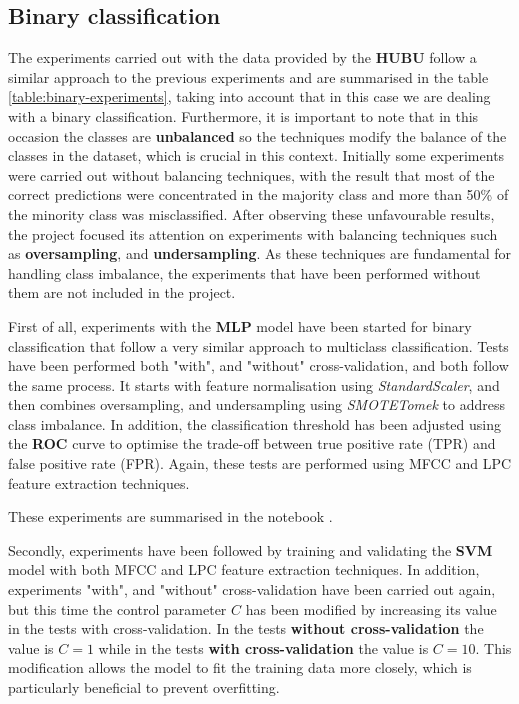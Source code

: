 \newpage

\subsection{Binary classification}

The experiments carried out with the data provided by the \textbf{HUBU} follow a similar approach to the previous experiments and are summarised in the table \ref{table:binary-experiments}, taking into account that in this case we are dealing with a binary classification. Furthermore, it is important to note that in this occasion the classes are \textbf{unbalanced} so the techniques modify the balance of the classes in the dataset, which is crucial in this context. Initially some experiments were carried out without balancing techniques, with the result that most of the correct predictions were concentrated in the majority class and more than 50\% of the minority class was misclassified. After observing these unfavourable results, the project focused its attention on experiments with balancing techniques such as \textbf{oversampling}, and \textbf{undersampling}. As these techniques are fundamental for handling class imbalance, the experiments that have been performed without them are not included in the project. 


First of all, experiments with the \textbf{MLP} model have been started for binary classification that follow a very similar approach to multiclass classification. Tests have been performed both "with", and "without" cross-validation, and both follow the same process. It starts with feature normalisation using \textit{StandardScaler}, and then combines oversampling, and undersampling using \textit{SMOTETomek} to address class imbalance. In addition, the classification threshold has been adjusted using the \textbf{ROC} curve to optimise the trade-off between true positive rate (TPR) and false positive rate (FPR). Again, these tests are performed using MFCC and LPC feature extraction techniques. 


These experiments are summarised in the notebook 
.


Secondly, experiments have been followed by training and validating the \textbf{SVM} model with both MFCC and LPC feature extraction techniques. In addition, experiments "with", and "without" cross-validation have been carried out again, but this time the control parameter \( C \) has been modified by increasing its value in the tests with cross-validation. In the tests \textbf{without cross-validation} the value is \( C = 1 \) while in the tests \textbf{with cross-validation} the value is \( C = 10 \). This modification allows the model to fit the training data more closely, which is particularly beneficial to prevent overfitting. 


